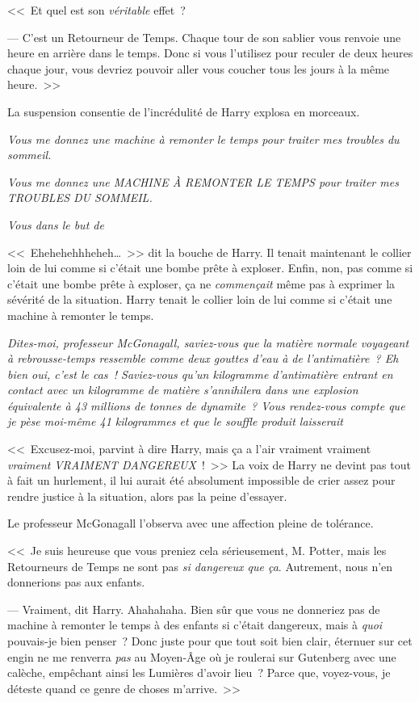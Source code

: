 <<~Et quel est son \emph{véritable} effet~?

--- C'est un Retourneur de Temps. Chaque tour de son sablier vous renvoie une heure en arrière dans le temps. Donc si vous l'utilisez pour reculer de deux heures chaque jour, vous devriez pouvoir aller vous coucher tous les jours à la même heure.~>>

La suspension consentie de l'incrédulité de Harry explosa en morceaux.

\emph{Vous me donnez une machine à remonter le temps pour traiter mes troubles du sommeil.}

\emph{Vous me donnez une MACHINE À REMONTER LE TEMPS pour traiter mes TROUBLES DU SOMMEIL.}

\emph{Vous  dans le but de }

<<~Ehehehehhheheh…~>> dit la bouche de Harry. Il tenait maintenant le collier loin de lui comme si c'était une bombe prête à exploser. Enfin, non, pas comme si c'était une bombe prête à exploser, ça ne \emph{commençait} même pas à exprimer la sévérité de la situation. Harry tenait le collier loin de lui comme si c'était une machine à remonter le temps.

\emph{Dites-moi, professeur McGonagall, saviez-vous que la matière normale voyageant à rebrousse-temps ressemble comme deux gouttes d'eau à de l'antimatière~? Eh bien oui, c'est le cas~! Saviez-vous qu'un kilogramme d'antimatière entrant en contact avec un kilogramme de matière s'annihilera dans une explosion équivalente à 43 millions de tonnes de dynamite~? Vous rendez-vous compte que je pèse moi-même 41 kilogrammes et que le souffle produit laisserait }

<<~Excusez-moi, parvint à dire Harry, mais ça a l'air vraiment vraiment \emph{vraiment} \emph{VRAIMENT DANGEREUX}~!~>> La voix de Harry ne devint pas tout à fait un hurlement, il lui aurait été absolument impossible de crier assez pour rendre justice à la situation, alors pas la peine d'essayer.

Le professeur McGonagall l'observa avec une affection pleine de tolérance.

<<~Je suis heureuse que vous preniez cela sérieusement, M. Potter, mais les Retourneurs de Temps ne sont pas \emph{si dangereux que ça}. Autrement, nous n'en donnerions pas aux enfants.

--- Vraiment, dit Harry. Ahahahaha. Bien sûr que vous ne donneriez pas de machine à remonter le temps à des enfants si c'était dangereux, mais à \emph{quoi} pouvais-je bien penser~? Donc juste pour que tout soit bien clair, éternuer sur cet engin ne me renverra \emph{pas} au Moyen-Âge où je roulerai sur Gutenberg avec une calèche, empêchant ainsi les Lumières d'avoir lieu~? Parce que, voyez-vous, je déteste quand ce genre de choses m'arrive.~>>


